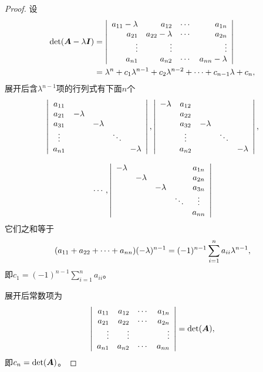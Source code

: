 \begin{frame}\ft{\subsecname}  

\begin{proof}
  设
  $$
  \begin{aligned}
  \mathrm{det}(\boldsymbol{A}-\lambda\boldsymbol{I})&=\left|
    \begin{array}{rrrr}
      a_{11}-\lambda&a_{12}&\cdots&a_{1n}\\
      a_{21}&a_{22}-\lambda&\cdots&a_{2n}\\
      \vdots&\vdots&&\vdots\\
      a_{n1}&a_{n2}&\cdots&a_{nn}-\lambda
    \end{array}
  \right|\\
  &=\lambda^n+c_1\lambda^{n-1}+c_2\lambda^{n-2}+\cdots+c_{n-1}\lambda+c_n,
  \end{aligned}
  $$
  展开后含$\lambda^{n-1}$项的行列式有下面$n$个
  $$
    \left|
      \begin{array}{ccccc}
        a_{11}&&&&\\
        a_{21}&-\lambda&&&\\
        a_{31}&&-\lambda&&\\
        \vdots&&&\ddots&\\
        a_{n1}&&&&-\lambda
      \end{array}
      \right|,
      \left|
        \begin{array}{ccccc}
          -\lambda&a_{12}&&&\\
                  &a_{22}&&&\\
                  &a_{32}&-\lambda&&\\
                  &\vdots&&\ddots&\\
                  &a_{n2}&&&-\lambda
        \end{array}
      \right|,
      $$

      $$
      \cdots,
      \left|
        \begin{array}{ccccc}
          -\lambda&&&&a_{1n}\\
                  &-\lambda&&&a_{2n}\\
                  &&-\lambda&&a_{3n}\\
                  &&&\ddots&\vdots\\
                  &&&&a_{nn}
        \end{array}
      \right|
    $$
  它们之和等于
  $$
  (a_{11}+a_{22}+\cdots+a_{nn})(-\lambda)^{n-1}=(-1)^{n-1}\sum_{i=1}^na_{ii}\lambda^{n-1},
  $$
  即$c_1=(-1)^{n-1}\sum_{i=1}^na_{ii}$。

  展开后常数项为
  $$
  \left|
    \begin{array}{rrrr}
      a_{11}&a_{12}&\cdots&a_{1n}\\
      a_{21}&a_{22}&\cdots&a_{2n}\\
      \vdots&\vdots&&\vdots\\
      a_{n1}&a_{n2}&\cdots&a_{nn}
    \end{array}
  \right|=\mathrm{det}(\boldsymbol{A}),
  $$
  即$c_n=\mathrm{det}(\boldsymbol{A})$。


\end{proof}
\end{frame}
